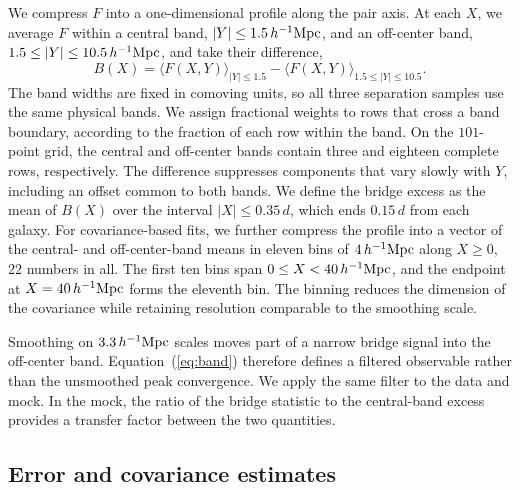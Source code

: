 \documentclass[preprint]{aastex701}
\newcommand{\hinvMpc}{h^{-1}{\rm Mpc}}
\begin{document}
 {
We compress $F$ into a one-dimensional profile along the pair axis. At each
$X$, we average $F$ within a central band, $|Y|\leq1.5\,\hinvMpc$, and an
off-center band, $1.5\leq|Y|\leq10.5\,\hinvMpc$, and take their difference,
\begin{equation}
  B(X) = \langle F(X,Y)\rangle_{|Y|\leq1.5}
       - \langle F(X,Y)\rangle_{1.5\leq|Y|\leq10.5}.
  \label{eq:band}
\end{equation}
The band widths are fixed in comoving units, so all three separation samples
use the same physical bands. We assign fractional weights to rows that cross
a band boundary, according to the fraction of each row within the band. On
the $101$-point grid, the central and off-center bands contain three and
eighteen complete rows, respectively. The difference suppresses components
that vary slowly with $Y$, including an offset common to both bands. We
define the bridge excess as the mean of $B(X)$ over the interval
$|X|\leq0.35\,d$, which ends $0.15\,d$ from each galaxy. For
covariance-based fits, we further compress the profile into a vector of the
central- and off-center-band means in eleven bins of
$4\,\hinvMpc$ along $X\geq0$, $22$ numbers in all. The first ten bins span
$0\leq X<40\,\hinvMpc$, and the endpoint at $X=40\,\hinvMpc$ forms the
eleventh bin. The binning reduces the dimension of the covariance while
retaining resolution comparable to the smoothing scale.

Smoothing on $3.3\,\hinvMpc$ scales moves part of a narrow bridge signal into
the off-center band. Equation~(\ref{eq:band}) therefore defines a filtered
observable rather than the unsmoothed peak convergence. We apply the same
filter to the data and mock. In the mock, the ratio of the bridge statistic
to the central-band excess provides a transfer factor between the two
quantities.
}\fi

\subsection{Error and covariance estimates}
\label{sec:errors}
\end{document}
